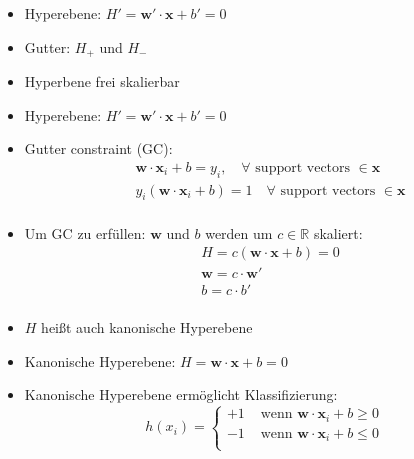 \begin{frame}
     {
        \begin{itemize}
            \item Hyperebene: $ H' = \boldsymbol{w}' \cdot \boldsymbol{x} + b' = 0 $
            \item Gutter: $H_+$ und $H_-$
            \item Hyperbene frei skalierbar
        \end{itemize}
    } {
        \begin{itemize}
            \item Hyperebene: $ H' = \boldsymbol{w}' \cdot \boldsymbol{x} + b' = 0 $
            \item Gutter constraint (GC):
                \begin{align*}
                    & \boldsymbol{w} \cdot \boldsymbol{x}_i + b = y_i, \quad \forall \text{ support vectors } \in \boldsymbol{x} \\
                    & y_i ( \boldsymbol{w} \cdot \boldsymbol{x}_i + b ) = 1 \quad \forall \text{ support vectors } \in \boldsymbol{x} \\
                \end{align*}
            \item Um GC zu erfüllen: $ \boldsymbol{w} $ und $b$ werden um $ c \in \mathbb{R} $ skaliert:
                \begin{align*}
                    & H = c ( \boldsymbol{w} \cdot \boldsymbol{x} + b ) = 0 \\
                    & \boldsymbol{w} = c \cdot \boldsymbol{w}' \\
                    & b = c \cdot b' \\
                \end{align*}
            \item $H$ heißt auch kanonische Hyperebene
        \end{itemize}
    } {
        \begin{itemize}
            \item Kanonische Hyperebene: $ H = \boldsymbol{w} \cdot \boldsymbol{x} + b = 0 $
            \item Kanonische Hyperebene ermöglicht Klassifizierung:
                \begin{equation*}
                    h(x_i) = \begin{cases}
                        +1 & \text{ wenn } \boldsymbol{w} \cdot \boldsymbol{x}_i + b \geq 0 \\
                        -1 & \text{ wenn } \boldsymbol{w} \cdot \boldsymbol{x}_i + b \leq 0 \\
                    \end{cases}
                \end{equation*}
        \end{itemize}
    }
\end{frame}

